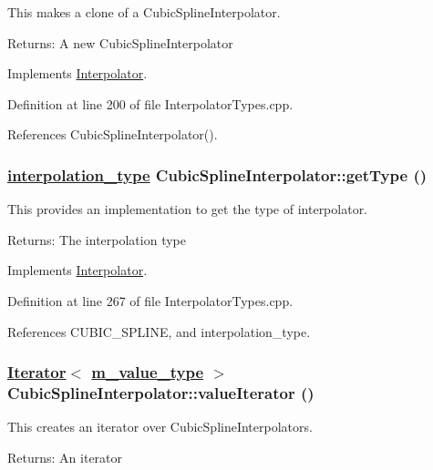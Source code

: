 This makes a clone of a Cubic\-Spline\-Interpolator. \begin{Desc}
\item[Returns:]A new Cubic\-Spline\-Interpolator \end{Desc}


Implements \hyperlink{classInterpolator_a1}{Interpolator}.

Definition at line 200 of file Interpolator\-Types.cpp.

References Cubic\-Spline\-Interpolator().\hypertarget{classCubicSplineInterpolator_a3}{
\subsubsection[getType]{\setlength{\rightskip}{0pt plus 5cm}\hyperlink{Types_8h_a13}{interpolation\_\-type} Cubic\-Spline\-Interpolator::get\-Type ()}}
\label{classCubicSplineInterpolator_a3}


This provides an implementation to get the type of interpolator. \begin{Desc}
\item[Returns:]The interpolation type \end{Desc}


Implements \hyperlink{classInterpolator_a6}{Interpolator}.

Definition at line 267 of file Interpolator\-Types.cpp.

References CUBIC\_\-SPLINE, and interpolation\_\-type.\hypertarget{classCubicSplineInterpolator_a2}{
\subsubsection[valueIterator]{\setlength{\rightskip}{0pt plus 5cm}\hyperlink{classIterator}{Iterator}$<$ \hyperlink{Types_8h_a3}{m\_\-value\_\-type} $>$ Cubic\-Spline\-Interpolator::value\-Iterator ()}}
\label{classCubicSplineInterpolator_a2}


This creates an iterator over Cubic\-Spline\-Interpolators. \begin{Desc}
\item[Returns:]An iterator \end{Desc}


